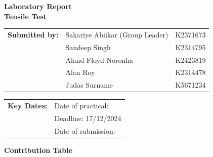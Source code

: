 \documentclass{article}
\begin{document}
        

    \vspace*{\fill}
    \begin{center}
        \textbf{\Huge Laboratory Report}\\[10pt]
        \LARGE \textbf{Tensile Test}
    \end{center}
    \vspace*{\fill}

    \Large    
    \begin{tabular}{@{}l l l@{}}
        \textbf{Submitted by:} & Sakariye Abiikar (Group Leader) & K2371673 \\
        & Sandeep Singh & K2314795 \\
        & Aland Floyd Noronha & K2423819 \\
        & Alan Roy & K2314478 \\
        & Judas Surname & K5671234 \\
    \end{tabular}
    
    \vspace*{\fill}
    
    \begin{tabular}{@{}l l@{}}
        \textbf{Key Dates:} & Date of practical: \\
        & Deadline: 17/12/2024 \\
        & Date of submission: \\
    \end{tabular}
    \vspace*{\fill}
    
    \large
    \newpage\noindent\vspace{2em}
    \begin{center}
        \LARGE \textbf{Contribution Table}\\[3em]
    \end{center}
    
\end{document}
